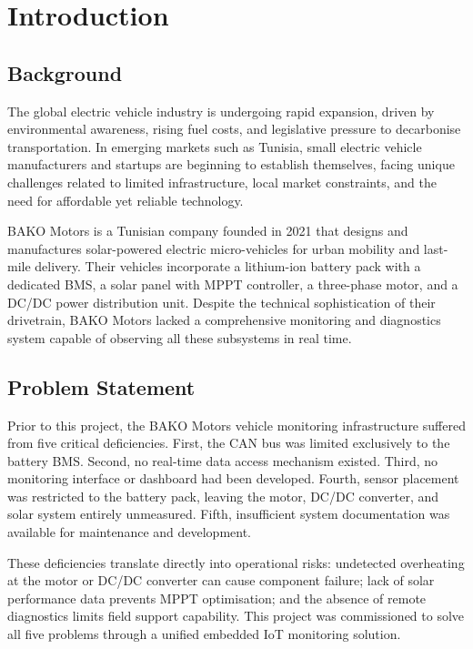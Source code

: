 \section{Introduction}

\subsection{Background}

The global electric vehicle industry is undergoing rapid expansion, driven by environmental awareness, rising fuel costs, and legislative pressure to decarbonise transportation. In emerging markets such as Tunisia, small electric vehicle manufacturers and startups are beginning to establish themselves, facing unique challenges related to limited infrastructure, local market constraints, and the need for affordable yet reliable technology.

BAKO Motors is a Tunisian company founded in 2021 that designs and manufactures solar-powered electric micro-vehicles for urban mobility and last-mile delivery. Their vehicles incorporate a lithium-ion battery pack with a dedicated BMS, a solar panel with MPPT controller, a three-phase motor, and a DC/DC power distribution unit. Despite the technical sophistication of their drivetrain, BAKO Motors lacked a comprehensive monitoring and diagnostics system capable of observing all these subsystems in real time.

\subsection{Problem Statement}

Prior to this project, the BAKO Motors vehicle monitoring infrastructure suffered from five critical deficiencies. First, the CAN bus was limited exclusively to the battery BMS. Second, no real-time data access mechanism existed. Third, no monitoring interface or dashboard had been developed. Fourth, sensor placement was restricted to the battery pack, leaving the motor, DC/DC converter, and solar system entirely unmeasured. Fifth, insufficient system documentation was available for maintenance and development.

These deficiencies translate directly into operational risks: undetected overheating at the motor or DC/DC converter can cause component failure; lack of solar performance data prevents MPPT optimisation; and the absence of remote diagnostics limits field support capability. This project was commissioned to solve all five problems through a unified embedded IoT monitoring solution.

